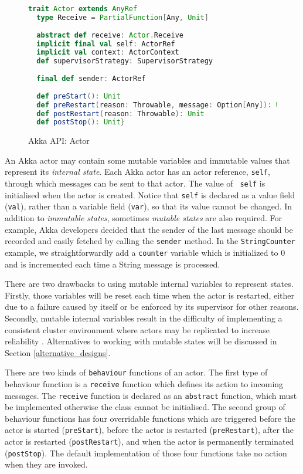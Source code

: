 \begin{figure}[h]
\begin{lstlisting}[language=scala]
trait Actor extends AnyRef
  type Receive = PartialFunction[Any, Unit]
  
  abstract def receive: Actor.Receive
  implicit final val self: ActorRef  
  implicit val context: ActorContext
  def supervisorStrategy: SupervisorStrategy
  
  final def sender: ActorRef
  
  def preStart(): Unit
  def preRestart(reason: Throwable, message: Option[Any]): Unit
  def postRestart(reason: Throwable): Unit  
  def postStop(): Unit}
\end{lstlisting}
\caption{Akka API: Actor}
\label{akka_actor_api}
\end{figure}

An Akka actor may contain some mutable variables and immutable values that 
represent its {\it internal state}.  Each Akka actor has an actor reference, 
{\tt self}, through which messages can be sent to that actor.  The value of 
{\tt 
self} is initialised when the actor is created. Notice that {\tt self} is 
declared as a value field ({\tt val}), rather than a variable field 
({\tt var}), so that its value cannot be changed.  In addition to {\it 
immutable 
states}, sometimes {\it mutable states} are also required.  For example, Akka 
developers decided that the sender of the last message should be recorded and 
easily fetched by calling the {\tt sender} method.  In the {\tt StringCounter} 
example, we straightforwardly add a {\tt counter} variable which is initialized 
to 0 and is incremented each time a String message is processed.

There are two drawbacks to using mutable internal variables to represent 
states. Firstly, those variables will be reset each time when the actor is 
restarted, either due to a failure caused by itself or be enforced by its 
supervisor for other reasons.  Secondly, mutable internal variables result in 
the difficulty of implementing a consistent cluster environment where actors may 
be replicated to increase reliability \citep{Kuhn12}.  Alternatives to 
working with mutable states will be discussed in Section 
\ref{alternative_designs}.

There are two kinds of {\tt behaviour} functions of an actor.  The first type of 
behaviour function is a {\tt receive} function which defines its action to 
incoming messages.  The {\tt receive} function is declared as an {\tt abstract} 
function, which must be implemented otherwise the class cannot be initialised. 
The second group of behaviour functions has four overridable functions which 
are triggered before the actor is started ({\tt preStart}), before the actor is 
restarted ({\tt preRestart}), after the actor is restarted ({\tt postRestart}), 
and when the actor is permanently terminated ({\tt postStop}). The default 
implementation of those four functions take no action when they are 
invoked.


